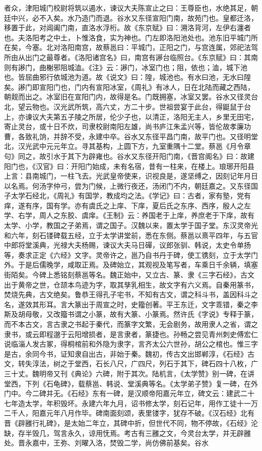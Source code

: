 \documentclass[12pt,UTF8]{ctexbook}
\begin{document}
者众，津阳城门校尉将筑以遏水，谏议大夫陈宣止之曰：王尊臣也，水绝其足，朝廷中兴，必不入矣。水乃造门而退。谷水又东径宣阳门南，故苑门也。皇都迁洛，移置于此，对阊阖门南，直洛水浮桁。故《东京赋》曰：溯洛背河，左伊右瀍者也。夫洛阳考之中土，卜惟洛食，实为神也。门左即洛阳池处也。池东旧平城门所在矣，今塞。北对洛阳南宫，故蔡邕曰：平城门，正阳之门，与宫连属，郊祀法驾所由从出门之最尊者。《洛阳诸宫名》曰，南宫有謻台临照台。《东京赋》曰：其南则有謻门，曲榭邪阻城洫。《注》云：謻门，冰室门也；阻，依也；洫，城下池也。皆屈曲邪行依城池为道。故《说文》曰：隍，城池也。有水曰池，无水曰隍矣。謻门即宣阳门也，门内有宣阳冰室，《周礼》有冰人，日在北陆而藏之西陆，朝觌而出之。冰室旧在宣阳门内，故得是名。门既拥塞，冰室又罢。谷水又径灵台北，望云物也。汉光武所筑，高六丈，方二十步。世祖尝宴于此台，得鼮鼠于台上，亦谏议大夫第五子陵之所居，伦少子也，以清正，洛阳无主人，乡里无田宅，寄止灵台，或十日不炊，司隶校尉南阳左雄，尚书庐江朱孟兴等，皆伦故孝廉功曹，各致礼饷，并辞不受，永建中卒。谷水又东径平昌门南，故平门也。又径明堂北，汉光武中元元年立。寻其基构，上圆下方，九室重隅十二堂。蔡邕《月令章句》同之，故引水于其下为辟雍也。谷水又东径开阳门南，《晋宫阁名》曰：故建阳门也，《汉官》曰：开阳门始成，未有名宿，昔有一柱来，在楼上。琅琊开阳县上言：县南城门，一柱飞去。光武皇帝使来，识视良是，遂坚缚之，因刻记年月日以名焉。何汤字仲弓，尝为门候，上微行夜还，汤闭门不内，朝廷嘉之。又东径国子太学石经北，《周礼》有国学，教成均之法。《学记》曰：古者，家有塾，党有痒，遂有序，国有学。亦有虞氏之上庠、下庠，夏后氏之东序、西序，殷人之左学、右学，周人之东胶、虞庠。《王制》云：养国老于上庠，养庶老于下庠，故有太学、小学，教国之子弟焉，谓之国子。汉魏以来，置太学于国子堂。东汉灵帝光和六年，刻石镂碑载五经，立于太学讲堂前，悉在东侧。蔡邕以熹平四年，与五官中郎将堂溪典，光禄大夫杨赐，谏议大夫马日磾，议郎张驯、韩说，太史令单扬等，奏求正定《六经》文字。灵帝许之，邕乃自书丹于碑，使工镌刻，立于太学门外。于是后儒晚学，咸取正焉。及碑始立，其观视及笔写者，车乘日千余辆，填塞街陌矣。今碑上悉铭刻蔡邕等名。魏正始中，又立古、篆、隶《三字石经》，古文出于黄帝之世，仓颉本鸟迹为字，取其孳乳相生，故文字有六义焉。自秦用篆书，焚烧先典，古文绝矣。鲁恭王得孔子宅书，不知有古文，谓之科斗书，盖因科斗之名，遂效其形耳。言大篆出于周宣之时，史籀创著。平王东迁，文字乖错，秦之李斯及胡母敬，又改籀书谓之小篆，故有大篆、小篆焉。然许氏《字说》专释于篆，而不本古文，言古隶之书起于秦代，而篆字文繁，无会剧务，故用隶人之省，谓之隶书，或云即程邈于云阳增损者，是言隶者，篆捷也。孙畅之尝见青州刺史傅宏仁说临淄人发古冢，得桐棺前和外隐为隶字，言齐太公六世孙，胡公之棺也。惟三字是古，余同今书，证知隶自出古，非始于秦。魏初，传古文出邯郸淳，《石经》古文，转失淳法，树之于堂西，石长八尺，广四尺，列石于其下，碑石四十八枚，广三十丈。魏明帝又刊《典论》六碑，附于其次。陆机言，《太学赞》别一碑，在讲堂西，下列《石龟碑》，载蔡邕、韩说、堂溪典等名。《太学弟子赞》复一碑，在外门中。今二碑并无。《石经》东有一碑，是汉顺帝阳嘉元年立，碑文云：建武二十七年造太学，年积毁坏。永建六年九月，诏书修太学，刻石记年，用作工徒十一万二千人，阳嘉元年八月作毕。碑南面刻颂，表里镂字，犹存不破。《汉石经》北有晋《辟雝行礼碑》，是太始二年立，其碑中折，但世代不同，物不停故，《石经》沦缺，存半毁几，驾言永久，谅用怃焉。考古有三雝之文，今灵台太学，并无辟雝处。晋永嘉中，王弥、刘曜入洛，焚毁二学，尚仿佛前基矣。谷水
\end{document}
